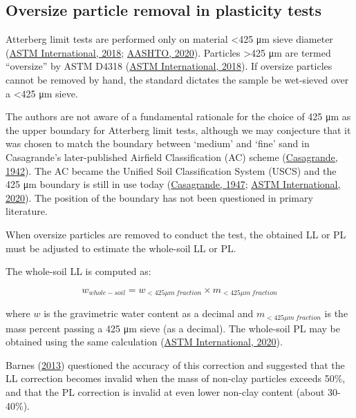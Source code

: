 \documentclass[
  letterpaper,
]{article}
\begin{document}
\hypertarget{oversize-particle-removal-in-plasticity-tests}{%
\subsection{Oversize particle removal in plasticity tests}\label{oversize-particle-removal-in-plasticity-tests}}

Atterberg limit tests are performed only on material \textless425 μm sieve diameter (\protect\hyperlink{ref-ASTMD43182018}{ASTM International, 2018}; \protect\hyperlink{ref-AASHTO2020a}{AASHTO, 2020}).
Particles \textgreater425 μm are termed ``oversize'' by ASTM D4318 (\protect\hyperlink{ref-ASTMD43182018}{ASTM International, 2018}).
If oversize particles cannot be removed by hand, the standard dictates the sample be wet-sieved over a \textless425 μm sieve.

The authors are not aware of a fundamental rationale for the choice of 425 μm as the upper boundary for Atterberg limit tests, although we may conjecture that it was chosen to match the boundary between `medium' and `fine' sand in Casagrande's later-published Airfield Classification (AC) scheme (\protect\hyperlink{ref-Casagrande1942}{Casagrande, 1942}).
The AC became the Unified Soil Classification System (USCS) and the 425 μm boundary is still in use today (\protect\hyperlink{ref-Casagrande1947}{Casagrande, 1947}; \protect\hyperlink{ref-ASTMD2487-17}{ASTM International, 2020}).
The position of the boundary has not been questioned in primary literature.

When oversize particles are removed to conduct the test, the obtained LL or PL must be adjusted to estimate the whole-soil LL or PL.

The whole-soil LL is computed as:

\begin{equation}
w_{whole-soil} = w_{<425{\mu}m~fraction} \times m_{<425{\mu}m~fraction}
\label{eq:oversize-correction-formula}
\end{equation}

where \(w\) is the gravimetric water content as a decimal and \(m_{<425{\mu}m~fraction}\) is the mass percent passing a 425 μm sieve (as a decimal).
The whole-soil PL may be obtained using the same calculation (\protect\hyperlink{ref-ASTMD2487-17}{ASTM International, 2020}).

Barnes (\protect\hyperlink{ref-Barnes2013}{2013}) questioned the accuracy of this correction and suggested that the LL correction becomes invalid when the mass of non-clay particles exceeds 50\%, and that the PL correction is invalid at even lower non-clay content (about 30-40\%).
\end{document}
